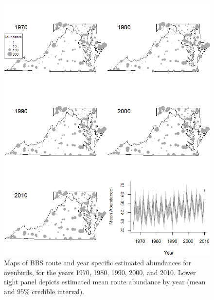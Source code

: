 \documentclass[12pt]{article}
\begin{document}
\begin{figure}
  \centering
  \includegraphics[width=6.6in]{figs/OVEN_N_by_route_year2}
\caption{Maps of BBS route and year specific estimated abundances for ovenbirds, for the years 1970,
1980, 1990, 2000, and 2010.  Lower right panel depicts estimated mean route abundance by year
(mean and 95\% credible interval).}
\label{fig:oven_N}
\end{figure}
\end{document}
